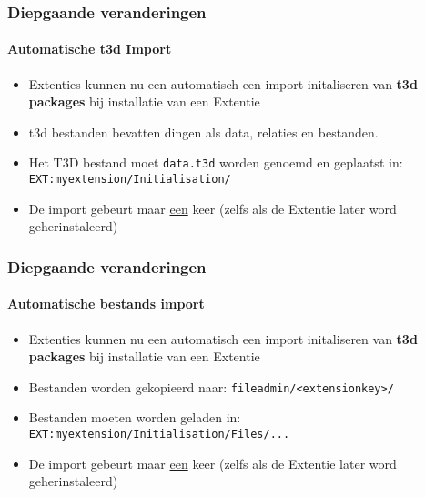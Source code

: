 
\begin{frame}[fragile]
	\frametitle{Diepgaande veranderingen}
	\framesubtitle{Automatische t3d Import}

	\begin{itemize}
		\item Extenties kunnen nu een automatisch een import initaliseren van \textbf{t3d packages} \newline
			bij installatie van een Extentie
		\item t3d bestanden bevatten dingen als data, relaties en bestanden. 
		\item Het T3D bestand moet \texttt{data.t3d} worden genoemd en geplaatst in:\newline
			\texttt{EXT:myextension/Initialisation/}

		\item De import gebeurt maar \underline{een} keer\newline
			(zelfs als de Extentie later word geherinstaleerd)

	\end{itemize}

\end{frame}


\begin{frame}[fragile]
	\frametitle{Diepgaande veranderingen}
	\framesubtitle{Automatische bestands import}

	\begin{itemize}
		\item Extenties kunnen nu een automatisch een import initaliseren van \textbf{t3d packages} \newline
			bij installatie van een Extentie
		\item Bestanden worden gekopieerd naar:\newline
			\texttt{fileadmin/<extensionkey>/}
		\item Bestanden moeten worden geladen in:\newline
			\texttt{EXT:myextension/Initialisation/Files/...}

		\item De import gebeurt maar \underline{een} keer\newline
			(zelfs als de Extentie later word geherinstaleerd)

	\end{itemize}

\end{frame}

